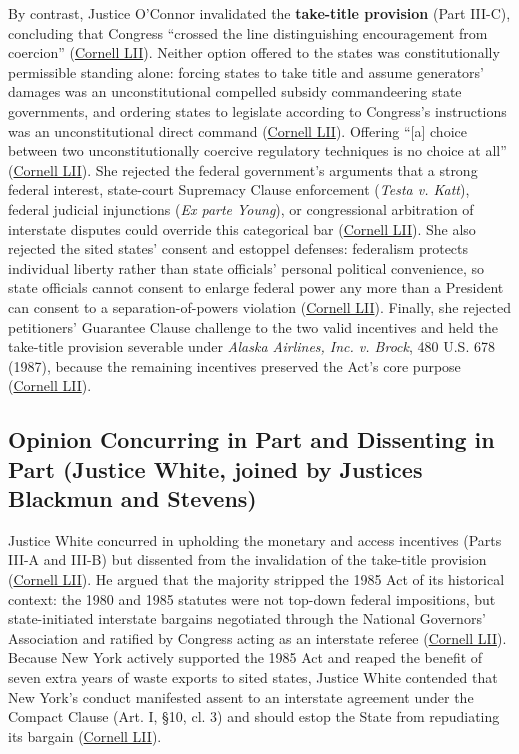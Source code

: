\documentclass[12pt]{article}
\begin{document}
By contrast, Justice O'Connor invalidated the \textbf{take-title provision} (Part III-C), concluding that Congress ``crossed the line distinguishing encouragement from coercion'' (\href{https://www.law.cornell.edu/supremecourt/text/505/144}{Cornell LII}). Neither option offered to the states was constitutionally permissible standing alone: forcing states to take title and assume generators' damages was an unconstitutional compelled subsidy commandeering state governments, and ordering states to legislate according to Congress's instructions was an unconstitutional direct command (\href{https://www.law.cornell.edu/supremecourt/text/505/144}{Cornell LII}). Offering ``[a] choice between two unconstitutionally coercive regulatory techniques is no choice at all'' (\href{https://www.law.cornell.edu/supremecourt/text/505/144}{Cornell LII}). She rejected the federal government's arguments that a strong federal interest, state-court Supremacy Clause enforcement (\textit{Testa v. Katt}), federal judicial injunctions (\textit{Ex parte Young}), or congressional arbitration of interstate disputes could override this categorical bar (\href{https://www.law.cornell.edu/supremecourt/text/505/144}{Cornell LII}). She also rejected the sited states' consent and estoppel defenses: federalism protects individual liberty rather than state officials' personal political convenience, so state officials cannot consent to enlarge federal power any more than a President can consent to a separation-of-powers violation (\href{https://www.law.cornell.edu/supremecourt/text/505/144}{Cornell LII}). Finally, she rejected petitioners' Guarantee Clause challenge to the two valid incentives and held the take-title provision severable under \textit{Alaska Airlines, Inc. v. Brock}, 480 U.S. 678 (1987), because the remaining incentives preserved the Act's core purpose (\href{https://www.law.cornell.edu/supremecourt/text/505/144}{Cornell LII}).

\subsection{Opinion Concurring in Part and Dissenting in Part (Justice White, joined by Justices Blackmun and Stevens)}

Justice White concurred in upholding the monetary and access incentives (Parts III-A and III-B) but dissented from the invalidation of the take-title provision (\href{https://www.law.cornell.edu/supremecourt/text/505/144}{Cornell LII}). He argued that the majority stripped the 1985 Act of its historical context: the 1980 and 1985 statutes were not top-down federal impositions, but state-initiated interstate bargains negotiated through the National Governors' Association and ratified by Congress acting as an interstate referee (\href{https://www.law.cornell.edu/supremecourt/text/505/144}{Cornell LII}). Because New York actively supported the 1985 Act and reaped the benefit of seven extra years of waste exports to sited states, Justice White contended that New York's conduct manifested assent to an interstate agreement under the Compact Clause (Art. I, \S 10, cl. 3) and should estop the State from repudiating its bargain (\href{https://www.law.cornell.edu/supremecourt/text/505/144}{Cornell LII}).
\end{document}
